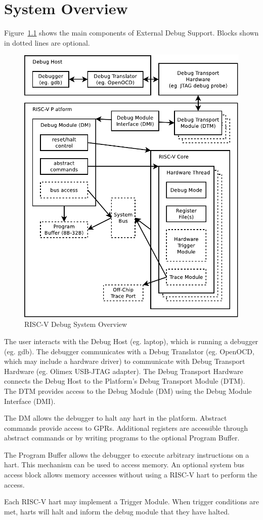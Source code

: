 \chapter{System Overview} \label{overview}

Figure~\ref{fig:overview} shows the main components of External Debug Support.
Blocks shown in dotted lines are optional. 

\begin{figure}
   \centering
   \includegraphics[width=\textwidth]{fig/overview-eps-converted-to.pdf}
   \caption{RISC-V Debug System Overview}
   \label{fig:overview}
\end{figure}

The user interacts with the Debug Host (eg. laptop), which is running a
debugger (eg. gdb).  The debugger communicates with a Debug Translator (eg.
OpenOCD, which may include a hardware driver) to communicate with Debug
Transport Hardware (eg.  Olimex USB-JTAG adapter).
The Debug Transport Hardware connects the Debug Host to the Platform's Debug
Transport Module (DTM).  The DTM provides access to the Debug Module (DM) using
the Debug Module Interface (DMI).

The DM allows the debugger to halt any hart in the platform. Abstract commands
provide access to GPRs. Additional registers are accessible through abstract
commands or by writing programs to the optional Program Buffer.

The Program Buffer allows the debugger to execute arbitrary instructions on a
hart. This mechanism can be used to access memory.  An optional system bus
access block allows memory accesses without using a RISC-V hart to perform the
access.

Each RISC-V hart may implement a Trigger Module. When trigger conditions
are met, harts will halt and inform the debug module that they have
halted.
